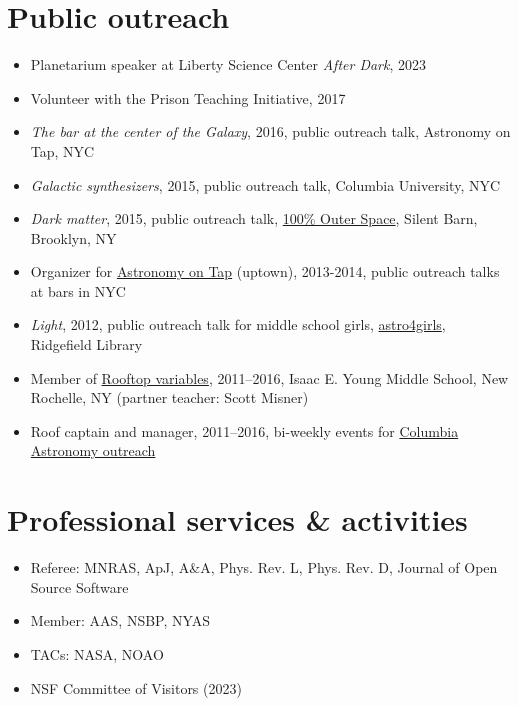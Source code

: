 \documentclass[12pt, letterpaper]{apw-cv}
\begin{document}
\section*{Public outreach}

\begin{itemize}
    \item Planetarium speaker at Liberty Science Center \emph{After Dark}, 2023
    \item Volunteer with the Prison Teaching Initiative, 2017
    \item \emph{The bar at the center of the Galaxy}, 2016, public outreach talk, Astronomy on Tap, NYC
    \item \emph{Galactic synthesizers}, 2015, public outreach talk, Columbia University, NYC
    \item \emph{Dark matter}, 2015, public outreach talk, \href{http://silentbarn.org/2015/03/100-outer-space-party}{100\% Outer Space}, Silent Barn, Brooklyn, NY
    \item Organizer for \href{http://astronomyontap.org/}{Astronomy on Tap} (uptown), 2013-2014, public outreach talks at bars in NYC
    \item \emph{Light}, 2012, public outreach talk for middle school girls, \href{http://www.newstimes.com/news/article/Astronomer-Shoot-for-the-stars-3380793.php}{astro4girls}, Ridgefield Library
    \item Member of \href{http://rv.astro.columbia.edu}{Rooftop variables}, 2011--2016, Isaac E. Young Middle School, New Rochelle, NY (partner teacher: Scott Misner)
    \item Roof captain and manager, 2011--2016, bi-weekly events for \href{http://outreach.astro.columbia.edu/}{Columbia Astronomy outreach}
\end{itemize}

\section*{Professional services \& activities}

\begin{itemize}
	\item Referee: MNRAS, ApJ, A\&A, Phys. Rev. L, Phys. Rev. D, Journal of Open Source Software
	\item Member: AAS, NSBP, NYAS
    \item TACs: NASA, NOAO
    \item NSF Committee of Visitors (2023)
\end{itemize}
\end{document}
